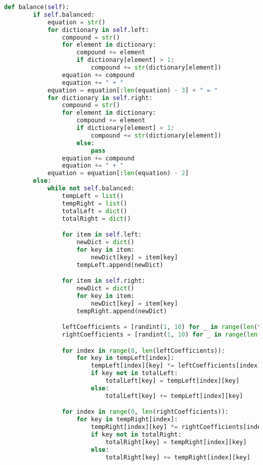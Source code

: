 \documentclass[a4paper,12pt]{article}
\begin{document}
\begin{lstlisting}[language=Python, caption=balance method]
def balance(self):
        if self.balanced:
            equation = str()
            for dictionary in self.left:
                compound = str()
                for element in dictionary:
                    compound += element
                    if dictionary[element] > 1:
                        compound += str(dictionary[element])
                equation += compound
                equation += " + "
            equation = equation[:len(equation) - 3] + " = "
            for dictionary in self.right:
                compound = str()
                for element in dictionary:
                    compound += element
                    if dictionary[element] > 1:
                        compound += str(dictionary[element])
                    else:
                        pass
                equation += compound
                equation += " + "
            equation = equation[:len(equation) - 2]
        else:
            while not self.balanced:
                tempLeft = list()
                tempRight = list()
                totalLeft = dict()
                totalRight = dict()

                for item in self.left:
                    newDict = dict()
                    for key in item:
                        newDict[key] = item[key]
                    tempLeft.append(newDict)

                for item in self.right:
                    newDict = dict()
                    for key in item:
                        newDict[key] = item[key]
                    tempRight.append(newDict)

                leftCoefficients = [randint(1, 10) for _ in range(len(tempLeft))]
                rightCoefficients = [randint(1, 10) for _ in range(len(tempRight))]

                for index in range(0, len(leftCoefficients)):
                    for key in tempLeft[index]:
                        tempLeft[index][key] *= leftCoefficients[index]
                        if key not in totalLeft:
                            totalLeft[key] = tempLeft[index][key]
                        else:
                            totalLeft[key] += tempLeft[index][key]

                for index in range(0, len(rightCoefficients)):
                    for key in tempRight[index]:
                        tempRight[index][key] *= rightCoefficients[index]
                        if key not in totalRight:
                            totalRight[key] = tempRight[index][key]
                        else:
                            totalRight[key] += tempRight[index][key]


\end{lstlisting}
\end{document}
